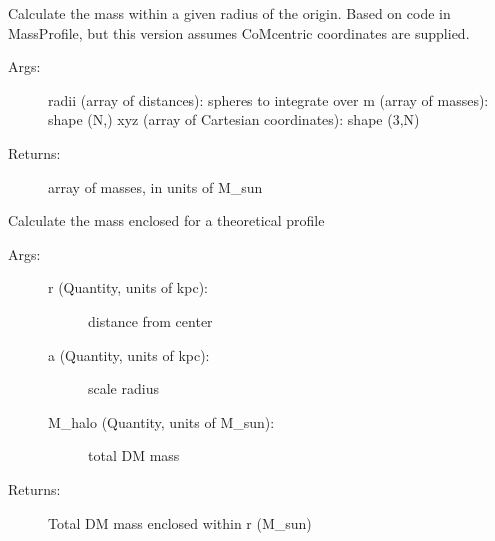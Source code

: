 \documentclass[letterpaper,10pt,english]{sphinxmanual}
\begin{document}
\begin{fulllineitems}
\begin{fulllineitems}
\end{fulllineitems}


\begin{fulllineitems}
\label{\detokenize{remnant:galaxy.remnant.Remnant.sub_mass_enclosed}}
Calculate the mass within a given radius of the origin.
Based on code in MassProfile, but this version assumes
CoM\sphinxhyphen{}centric coordinates are supplied.
\begin{description}
\item[{Args:}] \leavevmode
radii (array of distances): spheres to integrate over
m (array of masses): shape (N,)
xyz (array of Cartesian coordinates): shape (3,N)

\item[{Returns:}] \leavevmode
array of masses, in units of M\_sun

\end{description}

\end{fulllineitems}


\begin{fulllineitems}
\label{\detokenize{remnant:galaxy.remnant.Remnant.hernquist_mass}}
Calculate the mass enclosed for a theoretical profile
\begin{description}
\item[{Args:}] \leavevmode\begin{description}
\item[{r (Quantity, units of kpc): }] \leavevmode
distance from center

\item[{a (Quantity, units of kpc): }] \leavevmode
scale radius

\item[{M\_halo (Quantity, units of M\_sun): }] \leavevmode
total DM mass

\end{description}

\item[{Returns:}] \leavevmode
Total DM mass enclosed within r (M\_sun)


\end{description}
\end{fulllineitems}
\end{fulllineitems}
\end{document}

